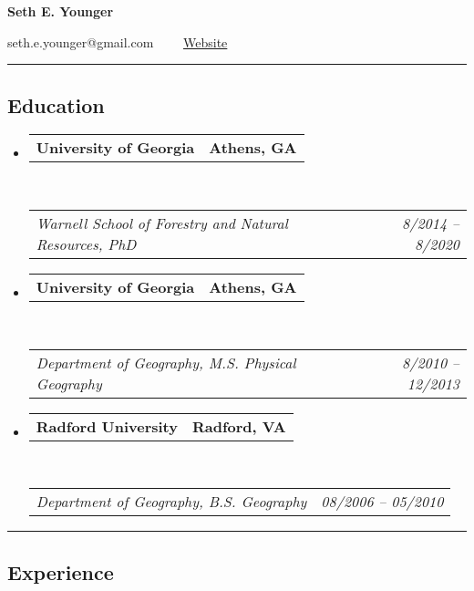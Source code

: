 \documentclass[10pt,letterpaper]{article}
\makeatletter
\newcommand{\headerrow}[2]
{\begin{tabular*}{\linewidth}{l@{\extracolsep{\fill}}r}
		#1 &
		#2 \\
\end{tabular*}}
\makeatother
\begin{document}
	
	
	\begin{center}
		{\LARGE \textbf{Seth E. Younger}}
		
		seth.e.younger@gmail.com\ \ \textbullet
		\ \ \href{http://www.sethyounger.com}{Website}
	\end{center}
	
	\hrule
	\vspace{-0.4em}
	\subsection*{Education}
	
	\begin{itemize}
		\parskip=0.1em
		
		\item 
		\headerrow
		{\textbf{University of Georgia}}
		{\textbf{Athens, GA}}
		\\
		\headerrow
		{\emph{Warnell School of Forestry and Natural Resources, PhD}}
		{\emph{8/2014 -- 8/2020}}
		
		\item 
		\headerrow
		{\textbf{University of Georgia}}
		{\textbf{Athens, GA}}
		\\
		\headerrow
		{\emph{Department of Geography, M.S. Physical Geography}}
		{\emph{8/2010 -- 12/2013}}
		
		\item 
		\headerrow
		{\textbf{Radford University}}
		{\textbf{Radford, VA}}
		\\
		\headerrow
		{\emph{Department of Geography, B.S. Geography}}
		{\emph{08/2006 -- 05/2010}}
		
	\end{itemize}
	
	\hrule
	\vspace{-0.4em}
	\subsection*{Experience}
	
\end{document}
